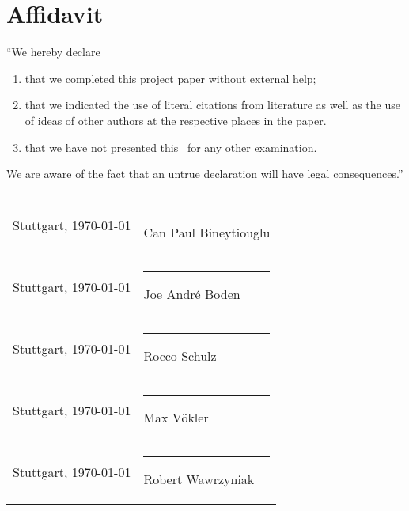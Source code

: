 \newpage
\pagestyle{empty}

\section*{Affidavit}

\vspace{0.5cm}

``We hereby declare\\

\begin{enumerate}
	\item that we completed this project paper without external help;
	\item that we indicated the use of literal citations from literature as well as the use of ideas of other authors at the respective places in the paper.
	\item that we have not presented this \papertype \ for any other examination.
\end{enumerate}

We are aware of the fact that an untrue declaration will have legal consequences.''
\\
\vspace{2.6cm}

\renewcommand{\arraystretch}{2} %

\begin{tabular*}{\textwidth} {p{} p{}}

Stuttgart, \today & \rule{0.4\textwidth}{1pt}\newline Can Paul Bineytiouglu\\

Stuttgart, \today & \rule{0.4\textwidth}{1pt}\newline Joe Andr\'{e} Boden\\

Stuttgart, \today & \rule{0.4\textwidth}{1pt}\newline Rocco Schulz\\

Stuttgart, \today & \rule{0.4\textwidth}{1pt}\newline Max V\"{o}kler\\

Stuttgart, \today & \rule{0.4\textwidth}{1pt}\newline Robert Wawrzyniak\\
\end{tabular*}

